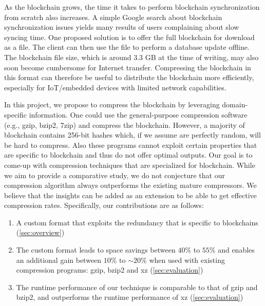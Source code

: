 As the blockchain grows, the time it takes to perform blockchain synchronization from scratch also increases.
A simple Google search about \eth{} blockchain synchronization issues yields many results of users complaining about slow syncing time.
One proposed solution is to offer the full blockchain for download as a file.
The client can then use the file to perform a database update offline.
The blockchain file size, which is around 3.3 GB at the time of writing, may also soon become cumbersome for Internet transfer.
Compressing the blockchain in this format can therefore be useful to distribute the blockchain more efficiently,
especially for IoT/embedded devices with limited network capabilities.

In this project, we propose to compress the \eth{} blockchain by leveraging domain-specific information.
One could use the general-purpose compression software (e.g., gzip, bzip2, 7zip) and compress the blockchain.
However, a majority of blockchain contains 256-bit hashes which, if we assume are perfectly random, will be hard to compress.
Also these programs cannot exploit certain properties that are specific to blockchain and thus do not offer optimal outputs.
Our goal is to come-up with compression techniques that  are specialized for blockchain.
While we aim to provide a comparative study, we do not conjecture that our compression algorithm always outperforms the
existing mature compressors.
We believe that the insights can be added as an extension to be able to get effective compression rates.
Specifically, our contributions are as follows:
\begin{enumerate}
	\item A custom format that exploits the redundancy that is specific to blockchains (\autoref{sec:overview}) 
	\item The custom format leads to space savings between $40\%$ to $55\%$ and enables an additional gain between $10\%$ to $\sim 20\%$ when used with existing compression programs: gzip, bzip2 and xz (\autoref{sec:evaluation})
	\item The runtime performance of our technique is comparable to that of gzip and bzip2, and outperforms the runtime performance of xz (\autoref{sec:evaluation})
\end{enumerate}
